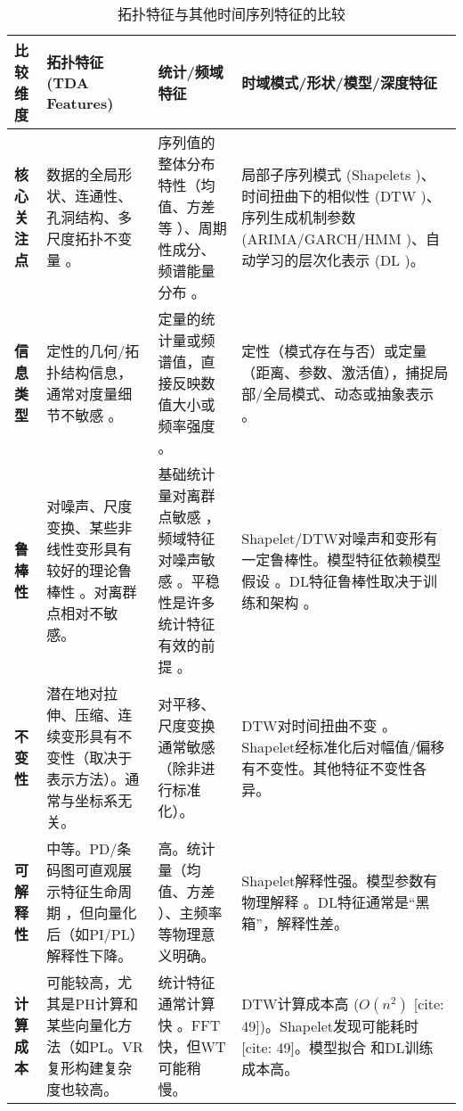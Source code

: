 \begin{table}[htbp] %
    \centering
    \caption{拓扑特征与其他时间序列特征的比较}
    \label{tab:feature_comparison}
    \small %
    \renewcommand{\arraystretch}{1.3} %
    \begin{tabular}{>{\raggedright}p{} >{\raggedright}p{} >{\raggedright}p{} >{\raggedright\arraybackslash}p{}}
        \toprule
        \textbf{比较维度} & \textbf{拓扑特征 (TDA Features)} & \textbf{统计/频域特征} & \textbf{时域模式/形状/模型/深度特征} \\
        \midrule
        \textbf{核心关注点} &
        数据的全局形状、连通性、孔洞结构、多尺度拓扑不变量 。 &
        序列值的整体分布特性（均值、方差等 ）、周期性成分、频谱能量分布 。 &
        局部子序列模式 (Shapelets )、时间扭曲下的相似性 (DTW )、序列生成机制参数 (ARIMA/GARCH/HMM )、自动学习的层次化表示 (DL )。 \\
        \addlinespace
        \textbf{信息类型} &
        定性的几何/拓扑结构信息，通常对度量细节不敏感 。 &
        定量的统计量或频谱值，直接反映数值大小或频率强度 。 &
        定性（模式存在与否）或定量（距离、参数、激活值），捕捉局部/全局模式、动态或抽象表示 。 \\
        \addlinespace
        \textbf{鲁棒性} &
        对噪声、尺度变换、某些非线性变形具有较好的理论鲁棒性 。对离群点相对不敏感。 &
        基础统计量对离群点敏感 ，频域特征对噪声敏感 。平稳性是许多统计特征有效的前提 。 &
        Shapelet/DTW对噪声和变形有一定鲁棒性。模型特征依赖模型假设 。DL特征鲁棒性取决于训练和架构 。 \\
        \addlinespace
        \textbf{不变性} &
        潜在地对拉伸、压缩、连续变形具有不变性（取决于表示方法）。通常与坐标系无关。 &
        对平移、尺度变换通常敏感（除非进行标准化）。 &
        DTW对时间扭曲不变 。Shapelet经标准化后对幅值/偏移有不变性。其他特征不变性各异。 \\
        \addlinespace
        \textbf{可解释性} &
        中等。PD/条码图可直观展示特征生命周期 ，但向量化后（如PI/PL）解释性下降。 &
        高。统计量（均值、方差 ）、主频率 等物理意义明确。 &
        Shapelet解释性强。模型参数有物理解释 。DL特征通常是“黑箱”，解释性差。 \\
        \addlinespace
        \textbf{计算成本} &
        可能较高，尤其是PH计算和某些向量化方法（如PL。VR复形构建复杂度也较高。 &
        统计特征通常计算快 。FFT快，但WT可能稍慢。 &
        DTW计算成本高 ($O(n^2)$ [cite: 49])。Shapelet发现可能耗时 [cite: 49]。模型拟合  和DL训练  成本高。 \\

\end{tabular}
\end{table}
